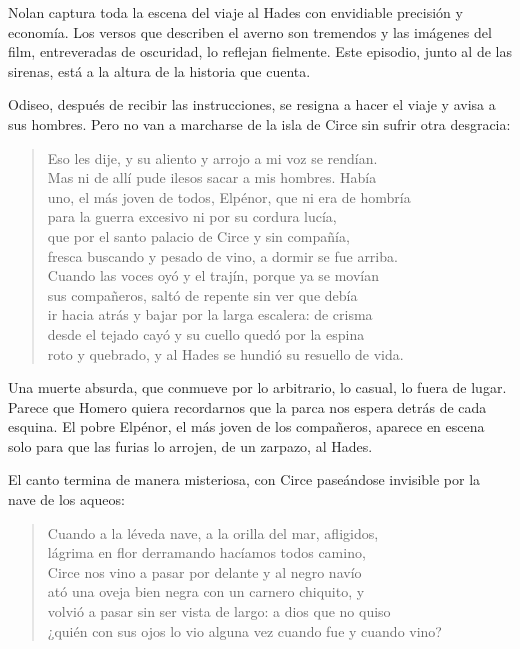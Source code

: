 \documentclass[11pt,a4paper]{article}
\begin{document}
Nolan captura toda la escena del viaje al Hades con envidiable precisión y economía. Los versos que describen el averno son tremendos y las imágenes del film, entreveradas de oscuridad, lo reflejan fielmente. Este episodio, junto al de las sirenas, está a la altura de la historia que cuenta.

Odiseo, después de recibir las instrucciones, se resigna a hacer el viaje y avisa a sus hombres. Pero no van a marcharse de la isla de Circe sin sufrir otra desgracia:

\begin{verse}
Eso les dije, y su aliento y arrojo a mi voz se rendían.\\
Mas ni de allí pude ilesos sacar a mis hombres. Había\\
uno, el más joven de todos, Elpénor, que ni era de hombría\\
para la guerra excesivo ni por su cordura lucía,\\
que por el santo palacio de Circe y sin compañía,\\
fresca buscando y pesado de vino, a dormir se fue arriba.\\
Cuando las voces oyó y el trajín, porque ya se movían\\
sus compañeros, saltó de repente sin ver que debía\\
ir hacia atrás y bajar por la larga escalera: de crisma\\
desde el tejado cayó y su cuello quedó por la espina\\
roto y quebrado, y al Hades se hundió su resuello de vida.
\end{verse}

Una muerte absurda, que conmueve por lo arbitrario, lo casual, lo fuera de lugar. Parece que Homero quiera recordarnos que la parca nos espera detrás de cada esquina. El pobre Elpénor, el más joven de los compañeros, aparece en escena solo para que las furias lo arrojen, de un zarpazo, al Hades.

El canto termina de manera misteriosa, con Circe paseándose invisible por la nave de los aqueos:

\begin{verse}
Cuando a la léveda nave, a la orilla del mar, afligidos,\\
lágrima en flor derramando hacíamos todos camino,\\
Circe nos vino a pasar por delante y al negro navío\\
ató una oveja bien negra con un carnero chiquito, y\\
volvió a pasar sin ser vista de largo: a dios que no quiso\\
¿quién con sus ojos lo vio alguna vez cuando fue y cuando vino?
\end{verse}
\end{document}
